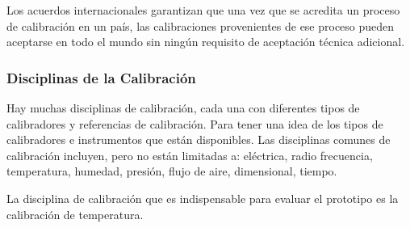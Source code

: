 \par \noindent
Los acuerdos internacionales garantizan que una vez que se acredita un proceso de calibración en un país, las calibraciones provenientes de ese proceso pueden aceptarse en todo el mundo sin ningún requisito de aceptación técnica adicional.\cite{calibracion-fluke}

\subsubsection{Disciplinas de la Calibración}

\par 
Hay muchas disciplinas de calibración, cada una con diferentes tipos de calibradores y referencias de calibración. Para tener una idea de los tipos de calibradores e instrumentos que están disponibles. Las disciplinas comunes de calibración incluyen, pero no están limitadas a: eléctrica, radio frecuencia, temperatura, humedad, presión, flujo de aire, dimensional, tiempo. \cite{calibracion-fluke}

\par \noindent
La disciplina de calibración que es indispensable para evaluar el prototipo es la calibración de temperatura.
